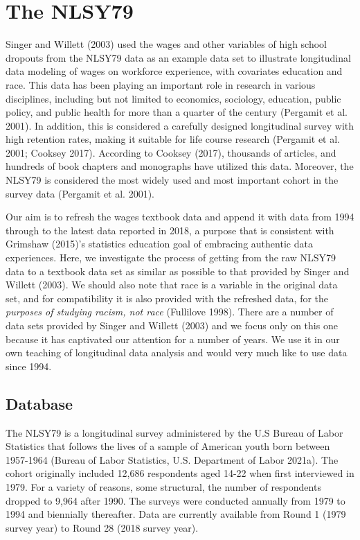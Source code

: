 \documentclass{article}
\begin{document}
\hypertarget{database}{%
\section{The NLSY79}\label{database}}

Singer and Willett (2003) used the wages and other variables of high school dropouts from the NLSY79 data as an example data set to illustrate longitudinal data modeling of wages on workforce experience, with covariates education and race. This data has been playing an important role in research in various disciplines, including but not limited to economics, sociology, education, public policy, and public health for more than a quarter of the century (Pergamit et al. 2001). In addition, this is considered a carefully designed longitudinal survey with high retention rates, making it suitable for life course research (Pergamit et al. 2001; Cooksey 2017). According to Cooksey (2017), thousands of articles, and hundreds of book chapters and monographs have utilized this data. Moreover, the NLSY79 is considered the most widely used and most important cohort in the survey data (Pergamit et al. 2001).

Our aim is to refresh the wages textbook data and append it with data from 1994 through to the latest data reported in 2018, a purpose that is consistent with Grimshaw (2015)'s statistics education goal of embracing authentic data experiences. Here, we investigate the process of getting from the raw NLSY79 data to a textbook data set as similar as possible to that provided by Singer and Willett (2003). We should also note that race is a variable in the original data set, and for compatibility it is also provided with the refreshed data, for the \emph{purposes of studying racism, not race} (Fullilove 1998). There are a number of data sets provided by Singer and Willett (2003) and we focus only on this one because it has captivated our attention for a number of years. We use it in our own teaching of longitudinal data analysis and would very much like to use data since 1994.

\hypertarget{database-1}{%
\subsection{Database}\label{database-1}}

The NLSY79 is a longitudinal survey administered by the U.S Bureau of Labor Statistics that follows the lives of a sample of American youth born between 1957-1964 (Bureau of Labor Statistics, U.S. Department of Labor 2021a). The cohort originally included 12,686 respondents aged 14-22 when first interviewed in 1979. For a variety of reasons, some structural, the number of respondents dropped to 9,964 after 1990. The surveys were conducted annually from 1979 to 1994 and biennially thereafter. Data are currently available from Round 1 (1979 survey year) to Round 28 (2018 survey year).
\end{document}
